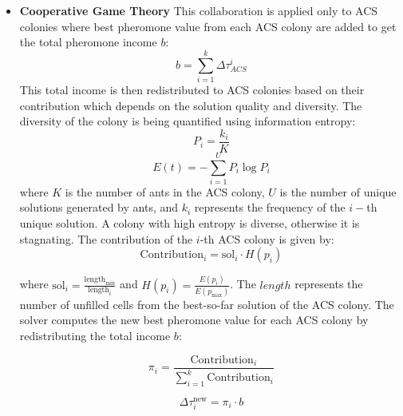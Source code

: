 \begin{itemize}
    \item[A.] \textbf{Cooperative Game Theory}
            This collaboration is applied only to ACS colonies where best pheromone value from each ACS colony are added to get the total pheromone income $b$:
            \begin{equation}
                    b = \sum_{i=1}^{k} \Delta \tau_{ACS}^{i}
                    \label{eqn:coop_game_1}
            \end{equation}
            This total income is then redistributed to ACS colonies based on their contribution which depends on the solution quality and diversity. The diversity of the colony is being quantified using information entropy:
            \begin{equation} 
            P_i = \frac{k_i}{K} 
            \label{eqn:coop_game_2}
            \end{equation}
            \begin{equation} 
            E(t) = - \sum_{i=1}^{U} P_i \log P_i
            \label{eqn:coop_game_3}
            \end{equation}
            where $K$ is the number of ants in the ACS colony, $U$ is the number of unique solutions generated by ants, and $k_i$ represents the frequency of the $i-$th unique solution. A colony with high entropy is diverse, otherwise it is stagnating. The contribution of the $i$-th ACS colony is given by:
            \begin{equation}
                \text{Contribution}_i = \text{sol}_i \cdot H(p_i)
                \label{eqn:coop_game_4}
            \end{equation}


            where $\text{sol}_i = \frac{\text{length}_{\min}}{\text{length}_i}$ and $H(p_i) = \frac{E(p_i)}{E(p_{\max})}$. The  $length$ represents the number of unfilled cells from the best-so-far solution of the ACS colony. The solver computes the new best pheromone value for each ACS colony by redistributing the total income $b$:

            \begin{equation}
                \pi_i = \frac{\text{Contribution}_i}{\sum_{i=1}^{k} \text{Contribution}_i}
                \label{eqn:coop_game_5}
            \end{equation}

            \begin{equation}
                \Delta\tau_i^{\text{new}} = \pi_i \cdot b
                \label{eqn:coop_game_6}
            \end{equation}


\end{itemize}
